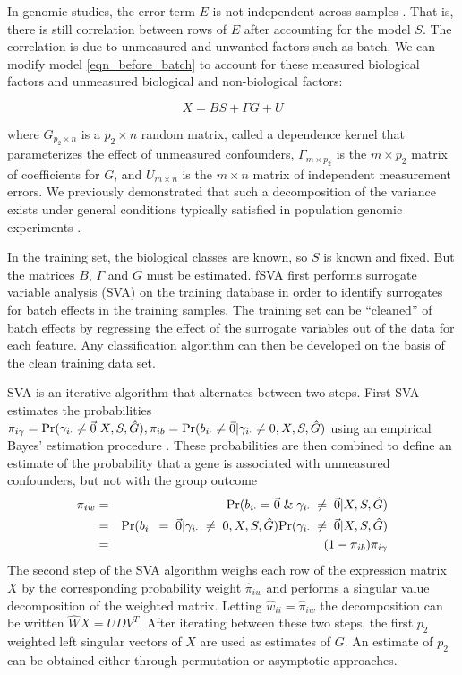 \documentclass{bioinfo}\usepackage{graphicx, color}
\newcommand{\p}{{\rm Pr}}
\begin{document}
In genomic studies, the error term $E$ is not independent across samples \citep{Johnson2007b,Leek2007,Leek2008,Walker2008,Friguet2009,Leek2010,Gagnon-Bartsch2011}.  That is, there is still correlation between rows of $E$ after accounting for the model $S$. The correlation is due to unmeasured and unwanted factors such as batch. We can modify model \ref{eqn_before_batch} to account for these measured biological factors and unmeasured biological and non-biological factors:

\begin{equation}
X = BS + \Gamma G + U
\label{full_expression_matrix}
\end{equation}

where $G_{p_2 \times n}$ is a $p_2 \times n$ random matrix, called a dependence kernel \citep{Leek2008} that parameterizes the effect of unmeasured confounders, $\Gamma_{m \times p_2}$ is the $m \times p_2$ matrix of coefficients for $G$, and $U_{m\times n}$ is the $m \times n$ matrix of independent measurement errors. We previously demonstrated that such a decomposition of the variance exists under general conditions typically satisfied in population genomic experiments \citep{Leek2008}. 

In the training set, the biological classes are known, so $S$ is known and fixed. But the matrices $B$, $\Gamma$ and $G$ must be estimated. fSVA first performs surrogate variable analysis (SVA) on the training database in order to identify surrogates for batch effects in the training samples. The training set can be ``cleaned'' of batch effects by regressing the effect of the surrogate variables out of the data for each feature. Any classification algorithm can then be developed on the basis of the clean training data set. 

SVA is an iterative algorithm that alternates between two steps. First SVA estimates the probabilities $\pi_{i\gamma} = \p(\gamma_{i\cdot} \neq \vec{0}| X, S, \hat{G}), \pi_{ib} = \p(b_{i\cdot} \neq \vec{0}| \gamma_{i\cdot} \neq 0, X, S, \hat{G})$ using an empirical Bayes' estimation procedure \citep{Leek2008,Efron2004b,Storey2005}. These probabilities are then combined to define an estimate of the probability that a gene is associated with unmeasured confounders, but not with the group outcome
\begin{eqnarray*}
\pi_{iw} &=& \p(b_{i\cdot} = \vec{0} \; \& \; \gamma_{i\cdot} \;\neq\; \vec{0} | X,S,\hat{G})\\
& = & \p(b_{i\cdot} \; = \; \vec{0}| \gamma_{i\cdot} \; \neq\; 0, X, S, \hat{G}) \p(\gamma_{i\cdot} \; \neq\; \vec{0}| X, S, \hat{G})\\
&=& (1-\pi_{ib})\pi_{i\gamma}
\end{eqnarray*}
The second step of the SVA algorithm weighs each row of the expression matrix $X$ by the corresponding probability weight $\hat{\pi}_{iw}$ and performs a singular value decomposition of the weighted matrix. Letting $\hat{w}_{ii} = \hat{\pi}_{iw}$ the decomposition can be written $\hat{W}X = UDV^T$. After iterating between these two steps, the first $p_2$ weighted left singular vectors of $X$ are used as estimates of $G$. An estimate of $p_2$ can be obtained either through permutation \citep{Buja1992} or asymptotic \citep{Leek2011} approaches. 
\end{document}
